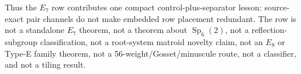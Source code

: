 Thus the \(E_7\) row contributes one compact control-plus-separator lesson: source-exact pair channels do not make embedded row placement redundant.  The row is not a standalone \(E_7\) theorem, not a theorem about \(\operatorname{Sp}_6(2)\), not a reflection-subgroup classification, not a root-system matroid novelty claim, not an \(E_8\) or Type-E family theorem, not a 56-weight/Gosset/minuscule route, not a classifier, and not a tiling result.